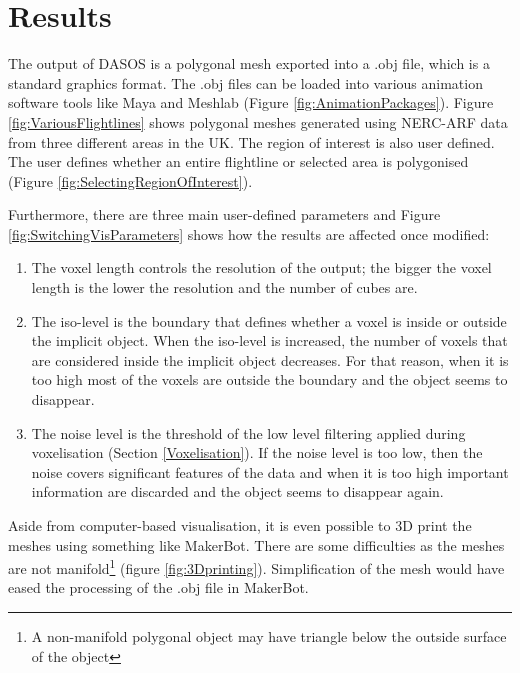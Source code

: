 \documentclass{subfiles}
\begin{document}
\section{Results}\label{sec:MCResults}

\par The output of DASOS is a polygonal mesh exported into a .obj file, which is a standard graphics format. The .obj files can be loaded into various animation software tools like Maya and Meshlab (Figure \ref{fig:AnimationPackages}). Figure \ref{fig:VariousFlightlines} shows polygonal meshes generated using NERC-ARF data from three different areas in the UK.  The region of interest is also user defined. The user defines whether an entire flightline or selected area is polygonised (Figure \ref{fig:SelectingRegionOfInterest}). 

\par Furthermore, there are three main user-defined parameters and Figure \ref{fig:SwitchingVisParameters} shows how the results are affected once modified:
\begin{enumerate}
	\item The voxel length controls the resolution of the output; the bigger the voxel length is the lower the resolution and the number of cubes are.
	\item The iso-level is the boundary that defines whether a voxel is inside or outside the implicit object. When the iso-level is increased, the number of voxels that are considered inside the implicit object decreases. For that reason, when it is too high most of the voxels are outside the boundary and the object seems to disappear.
	\item The noise level is the threshold of the low level filtering applied during voxelisation (Section \ref{Voxelisation}). If the noise level is too low, then the noise covers significant features of the data and when it is too high important information are discarded and the object seems to disappear again.
\end{enumerate}

 
\par Aside from computer-based visualisation, it is even possible to 3D print the meshes using something like MakerBot.  There are some difficulties as the meshes are not manifold\footnote{ A non-manifold polygonal object may have triangle below the outside surface of the object} (figure \ref{fig:3Dprinting}). Simplification of the mesh would have eased the processing of the .obj file in MakerBot. 
 
\end{document}

